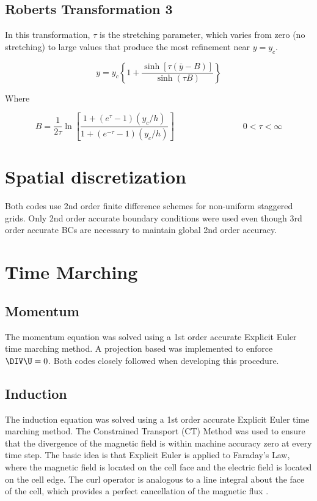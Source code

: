 \documentclass[11pt]{article}
\begin{document}
\subsection{Roberts Transformation 3}
In this transformation, $\tau$ is the stretching parameter, which varies from zero (no stretching) to large values that produce the most refinement near $y=y_c$.

\begin{equation}
	y
	=
	y_c
	\left\{
	1
	+
	\frac{\sinh[\tau (\bar{y}-B)]}
	{\sinh(\tau B)}
	\right\}
\end{equation}

Where

\begin{equation}
	B
	=
	\frac{1}{2\tau}
	\ln
	\left[
	\frac{1+(e^\tau-1) (y_c/h)}{1+(e^{-\tau}-1) (y_c/h)}
	\right]
	\qquad \qquad \qquad \qquad
	0 <\tau < \infty
\end{equation}


\section{Spatial discretization}
Both codes use 2nd order finite difference schemes for non-uniform staggered grids. Only 2nd order accurate boundary conditions were used even though 3rd order accurate BCs are necessary to maintain global 2nd order accuracy.

\section{Time Marching}
\subsection{Momentum}
The momentum equation was solved using a 1st order accurate Explicit Euler time marching method. A projection based was implemented to enforce $\DIV \U = 0$. Both codes closely followed \cite{griebel1997numerical} when developing this procedure.

\subsection{Induction}
The induction equation was solved using a 1st order accurate Explicit Euler time marching method. The Constrained Transport (CT) Method was used to ensure that the divergence of the magnetic field is within machine accuracy zero at every time step. The basic idea is that Explicit Euler is applied to Faraday's Law, where the magnetic field is located on the cell face and the electric field is located on the cell edge. The curl operator is analogous to a line integral about the face of the cell, which provides a perfect cancellation of the magnetic flux \cite{Toth2000}.
\end{document}
